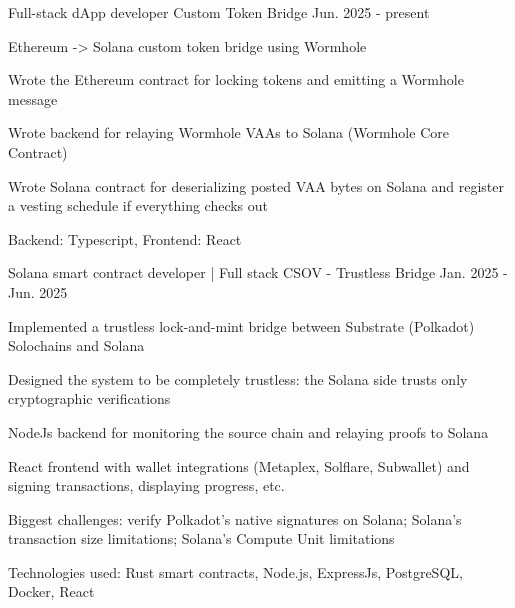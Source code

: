 

\begin{cventries}
  \cventry
  {Full-stack dApp developer} %
  {Custom Token Bridge} %
  {} %
  {Jun. 2025 - present} %
  {
    \begin{cvitems} %
      \item {Ethereum -> Solana custom token bridge using Wormhole}
      \item {Wrote the Ethereum contract for locking tokens and emitting a Wormhole message}
      \item {Wrote backend for relaying Wormhole VAAs to Solana (Wormhole Core Contract)}
      \item {Wrote Solana contract for deserializing posted VAA bytes on Solana and register a vesting schedule if everything checks out}
      \item {Backend: Typescript, Frontend: React}
    \end{cvitems}
  }
  
  \cventry
  {Solana smart contract developer | Full stack} %
  {CSOV - Trustless Bridge} %
  {} %
  {Jan. 2025 - Jun. 2025} %
  {
    \begin{cvitems} %
      \item {Implemented a trustless lock-and-mint bridge between Substrate (Polkadot) Solochains and Solana}
      \item {Designed the system to be completely trustless: the Solana side trusts only cryptographic verifications}
      \item {NodeJs backend for monitoring the source chain and relaying proofs to Solana}
      \item {React frontend with wallet integrations (Metaplex, Solflare, Subwallet) and signing transactions, displaying progress, etc.}
      \item {Biggest challenges: verify Polkadot's native signatures on Solana; Solana's transaction size limitations; Solana's Compute Unit limitations}
      \item {Technologies used: Rust smart contracts, Node.js, ExpressJs, PostgreSQL, Docker, React}
    \end{cvitems}
  }
  

\end{cventries}
